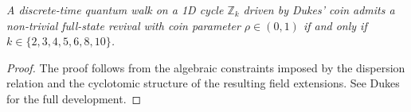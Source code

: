 \begin{theorem}
\textit{A discrete-time quantum walk on a 1D cycle $\mathbb{Z}_k$
driven by Dukes' coin admits a non-trivial full-state revival with
coin parameter $\rho \in (0,1)$ if and only if $k \in \{2, 3, 4, 5, 6,
8, 10\}$.}
\end{theorem}

\begin{proof}
The proof follows from the algebraic constraints imposed by the
dispersion relation and the cyclotomic structure of the resulting
field extensions. See Dukes~\cite{Dukes2014} for the full development.
\end{proof}
